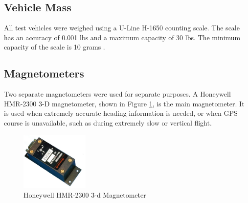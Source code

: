 \subsection*{Vehicle Mass}
All test vehicles were weighed using a U-Line H-1650 counting scale. The scale has an accuracy of 0.001 lbs and a maximum capacity of 30 lbs. The minimum capacity of the scale is 10 grams \cite{U-Line}.
\subsection*{Magnetometers}
Two separate magnetometers were used for separate purposes. A Honeywell HMR-2300 3-D magnetometer, shown in Figure \ref{hmr23000Picture}, is the main magnetometer. It is used when extremely accurate heading information is needed, or when GPS course is unavailable, such as during extremely slow or vertical flight.

\begin{figure}[H]

  \centering
    \includegraphics[width=0.3\textwidth]{figures/hmr2300.jpg}
      \caption{Honeywell HMR-2300 3-d Magnetometer } \label{hmr23000Picture}
\end{figure}

